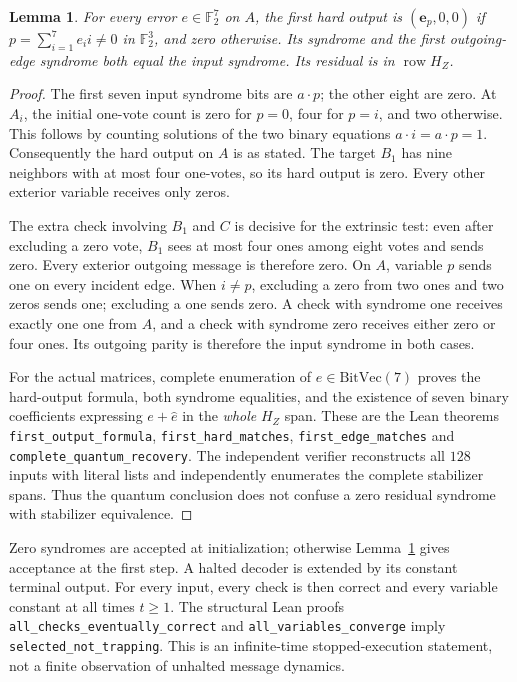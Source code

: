 \documentclass[11pt]{article}
\newtheorem{lemma}[theorem]{Lemma}
\newcommand{\row}{\operatorname{row}}
\begin{document}
\begin{lemma}\label{lem:recovery}
For every error $e\in\mathbb F_2^7$ on $A$, the first hard output is
$(\mathbf e_p,0,0)$ if $p=\sum_{i=1}^7 e_i i\ne0$ in $\mathbb F_2^3$,
and zero otherwise. Its syndrome and the first outgoing-edge syndrome
both equal the input syndrome. Its residual is in $\row H_Z$.
\end{lemma}
\begin{proof}
The first seven input syndrome bits are $a\cdot p$; the other eight are
zero. At $A_i$, the initial one-vote count is zero for $p=0$, four for
$p=i$, and two otherwise. This follows by counting solutions of the two
binary equations $a\cdot i=a\cdot p=1$. Consequently the hard output on
$A$ is as stated. The target $B_1$ has nine neighbors with at most four
one-votes, so its hard output is zero. Every other exterior variable
receives only zeros.

The extra check involving $B_1$ and $C$ is decisive for the extrinsic test:
even after excluding a zero vote, $B_1$ sees at most four ones among eight
votes and sends zero. Every exterior outgoing message is therefore zero.
On $A$, variable $p$ sends one on every incident edge. When $i\ne p$,
excluding a zero from two ones and two zeros sends one; excluding a one
sends zero. A check with syndrome one receives exactly one one from $A$,
and a check with syndrome zero receives either zero or four ones. Its
outgoing parity is therefore the input syndrome in both cases.

For the actual matrices, complete enumeration of $e\in\mathrm{BitVec}(7)$
proves the hard-output formula, both syndrome equalities, and the existence
of seven binary coefficients expressing $e+\hat e$ in the \emph{whole}
$H_Z$ span. These are the Lean theorems \texttt{first\_output\_formula},
\texttt{first\_hard\_matches}, \texttt{first\_edge\_matches} and
\texttt{complete\_quantum\_recovery}. The independent verifier reconstructs
all $128$ inputs with literal lists and independently enumerates the
complete stabilizer spans. Thus the quantum conclusion does not confuse a
zero residual syndrome with stabilizer equivalence.
\end{proof}
Zero syndromes are accepted at initialization; otherwise Lemma~\ref{lem:recovery}
gives acceptance at the first step. A halted decoder is extended by its
constant terminal output. For every input, every check is then correct and
every variable constant at all times $t\ge1$. The structural Lean proofs
\texttt{all\_checks\_eventually\_correct} and
\texttt{all\_variables\_converge} imply \texttt{selected\_not\_trapping}.
This is an infinite-time stopped-execution statement, not a finite
observation of unhalted message dynamics.
\end{document}
